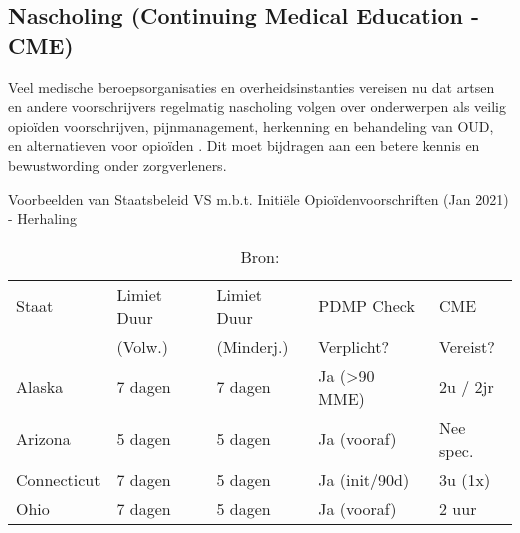 \documentclass[11pt, a4paper]{report} %
\begin{document}
\subsection{Nascholing (Continuing Medical Education - CME)}
Veel medische beroepsorganisaties en overheidsinstanties vereisen nu dat artsen en andere voorschrijvers regelmatig nascholing volgen over onderwerpen als veilig opioïden voorschrijven, pijnmanagement, herkenning en behandeling van OUD, en alternatieven voor opioïden \parencite{BallotpediaStateLimits}. Dit moet bijdragen aan een betere kennis en bewustwording onder zorgverleners.

\begin{table}[htbp]
    \centering
    \caption{Voorbeelden van Staatsbeleid VS m.b.t. Initiële Opioïdenvoorschriften (Jan 2021) - Herhaling}
    \label{tab:state_limits_repeat}
    \begin{tabular}{l l l l l}
        \toprule
        Staat        & Limiet Duur & Limiet Duur & PDMP Check  & CME      \\
                     & (Volw.)     & (Minderj.)  & Verplicht? & Vereist? \\
        \midrule
        Alaska       & 7 dagen     & 7 dagen     & Ja (>90 MME) & 2u / 2jr \\
        Arizona      & 5 dagen     & 5 dagen     & Ja (vooraf) & Nee spec. \\
        Connecticut  & 7 dagen     & 5 dagen     & Ja (init/90d)& 3u (1x)  \\
        Ohio         & 7 dagen     & 5 dagen     & Ja (vooraf) & 2 uur    \\
        \bottomrule
    \end{tabular}
    \caption*{\footnotesize Bron: \parencite{BallotpediaStateLimits}}
\end{table}
\end{document}
